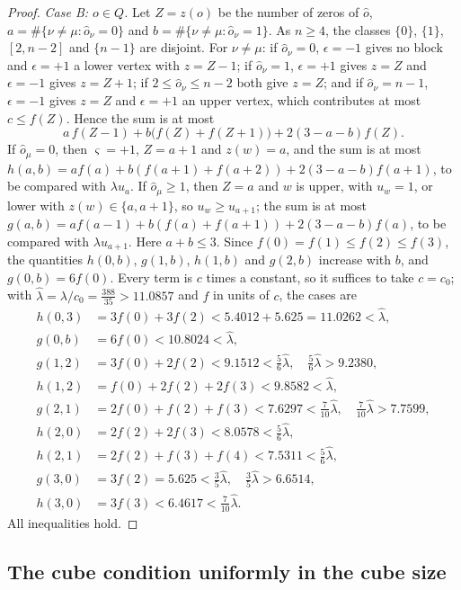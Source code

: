 \begin{proof}
\emph{Case B: $o\in Q$.} Let $Z=z(o)$ be the number of zeros of $\hat o$,
$a=\#\{\nu\ne\mu:\hat o_\nu=0\}$ and $b=\#\{\nu\ne\mu:\hat o_\nu=1\}$. As
$n\ge4$, the classes $\{0\}$, $\{1\}$, $[2,n-2]$ and $\{n-1\}$ are disjoint.
For $\nu\ne\mu$: if $\hat o_\nu=0$, $\epsilon=-1$ gives no block and
$\epsilon=+1$ a lower vertex with $z=Z-1$; if $\hat o_\nu=1$, $\epsilon=+1$
gives $z=Z$ and $\epsilon=-1$ gives $z=Z+1$; if $2\le\hat o_\nu\le n-2$ both
give $z=Z$; and if $\hat o_\nu=n-1$, $\epsilon=-1$ gives $z=Z$ and
$\epsilon=+1$ an upper vertex, which contributes at most $c\le f(Z)$. Hence the
sum is at most
\[
a\,f(Z-1)+b\bigl(f(Z)+f(Z+1)\bigr)+2(3-a-b)f(Z).
\]
If $\hat o_\mu=0$, then $\varsigma=+1$, $Z=a+1$ and $z(w)=a$, and the sum is at
most $h(a,b)=af(a)+b(f(a+1)+f(a+2))+2(3-a-b)f(a+1)$, to be compared with
$\lambda u_a$. If $\hat o_\mu\ge1$, then $Z=a$ and $w$ is upper, with $u_w=1$,
or lower with $z(w)\in\{a,a+1\}$, so $u_w\ge u_{a+1}$; the sum is at most
$g(a,b)=af(a-1)+b(f(a)+f(a+1))+2(3-a-b)f(a)$, to be compared with $\lambda
u_{a+1}$. Here $a+b\le3$. Since $f(0)=f(1)\le f(2)\le f(3)$, the quantities
$h(0,b)$, $g(1,b)$, $h(1,b)$ and $g(2,b)$ increase with $b$, and
$g(0,b)=6f(0)$. Every term is $c$ times a constant, so it suffices to take
$c=c_0$; with $\hat\lambda=\lambda/c_0=\frac{388}{35}>11.0857$ and $f$ in units
of $c$, the cases are
\begin{align*}
h(0,3)&=3f(0)+3f(2)<5.4012+5.625=11.0262<\hat\lambda,\\
g(0,b)&=6f(0)<10.8024<\hat\lambda,\\
g(1,2)&=3f(0)+2f(2)<9.1512<\tfrac56\hat\lambda,\quad\tfrac56\hat\lambda>9.2380,\\
h(1,2)&=f(0)+2f(2)+2f(3)<9.8582<\hat\lambda,\\
g(2,1)&=2f(0)+f(2)+f(3)<7.6297<\tfrac7{10}\hat\lambda,\quad
\tfrac7{10}\hat\lambda>7.7599,\\
h(2,0)&=2f(2)+2f(3)<8.0578<\tfrac56\hat\lambda,\\
h(2,1)&=2f(2)+f(3)+f(4)<7.5311<\tfrac56\hat\lambda,\\
g(3,0)&=3f(2)=5.625<\tfrac35\hat\lambda,\quad\tfrac35\hat\lambda>6.6514,\\
h(3,0)&=3f(3)<6.4617<\tfrac7{10}\hat\lambda.
\end{align*}
All inequalities hold.
\end{proof}

\subsection{The cube condition uniformly in the cube size}

